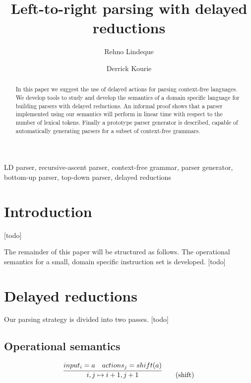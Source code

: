 \documentclass[envcountsame,runningheads]{llncs}
\begin{document}
\title{Left-to-right parsing with delayed reductions}
\author{Rehno Lindeque \and Derrick Kourie}
\maketitle

\begin{abstract}
In this paper we suggest the use of delayed actions for parsing context-free languages.
We develop tools to study and develop the semantics of a domain specific language for building parsers with delayed reductions.
An informal proof shows that a parser implemented using our semantics will perform in linear time with respect to the number of lexical tokens.
Finally a prototype parser generator is described, capable of automatically generating parsers for a subset of context-free grammars.
\end{abstract}

\begin{keywords}
LD parser, recursive-ascent parser, context-free grammar, parser generator, bottom-up parser, top-down parser, delayed reductions
\end{keywords}

\section{Introduction}

[todo]

The remainder of this paper will be structured as follows. 
The operational semantics for a small, domain specific instruction set is developed.
[todo]

\section{Delayed reductions}

Our parsing strategy is divided into two passes.
[todo]

\subsection{Operational semantics}

\begin{equation}
\infer{i, j \mapsto i+1, j+1}{input_i = a & actions_j = shift(a)} \tag{shift}
\end{equation}
\end{document}
